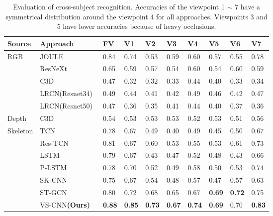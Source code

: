 \documentclass[journal]{IEEEtran}
\begin{document}
\begin{table*}[!t] \footnotesize
\begin{center}
\caption{Evaluation of cross-subject recognition. Accuracies of the viewpoint 1 $\sim$ 7 have a symmetrical distribution around the viewpoint 4 for all approaches. Viewpoints 3 and 5 have lower accuracies because of heavy occlusions.}
\label{tab:crossSub}
\begin{tabular}{|p{1 cm}|p{2.3cm}|p{1cm}|p{1cm}|p{1cm}|p{1cm}|p{1cm}|p{1cm}|p{1cm}|p{1cm}|}
\hline
Source & Approach & FV & V1 & V2 & V3  & V4 & V5 & V6 & V7  \\
\hline
\multirow{4}{*}{RGB} & JOULE~\cite{JOULE2016} & 0.84  & 0.74 & 0.53 & 0.59 & 0.60 & 0.57 & 0.55 & 0.78  \\
 & ResNeXt~\cite{ResNeXtARX2018} & 0.65  & 0.59 & 0.57 & 0.54 & 0.60 & 0.54 & 0.60 & 0.59 \\
 & C3D~\cite{C3DICCV2015} & 0.47  & 0.32  & 0.32  & 0.33  & 0.44  & 0.40  & 0.33  & 0.34   \\
 & LRCN(Resnet34)~\cite{LRCNCVPR2015} & 0.49  & 0.44  & 0.41  & 0.42  & 0.49  & 0.46  & 0.42  & 0.47  \\
 & LRCN(Resnet50)~\cite{LRCNCVPR2015} & 0.47  & 0.36  & 0.35  & 0.41  & 0.44  & 0.40  & 0.37  & 0.36  \\
 \hline
\multirow{1}{*}{Depth} & C3D~\cite{C3DICCV2015} & 0.54  &  0.53 & 0.53  & 0.53  & 0.52  & 0.53 & 0.51  & 0.56 \\
\hline
\multirow{7}{*}{Skeleton} & TCN~\cite{TCN2017} & 0.78 & 0.67 & 0.49 & 0.40 & 0.49 & 0.45 & 0.50 & 0.67 \\
 & Res-TCN~\cite{ResTCN2017} & 0.81 & 0.67 & 0.60 & 0.53 & 0.55 & 0.53 & 0.61 & 0.73  \\
 & LSTM~\cite{ShahroudyNTU2016} & 0.79 & 0.67 & 0.43 & 0.47 & 0.52 & 0.48 & 0.43 & 0.66  \\
 & P-LSTM~\cite{ShahroudyNTU2016} & 0.78 & 0.70 & 0.52 & 0.49 & 0.58 & 0.50 & 0.53 & 0.74 \\
 & SK-CNN~\cite{EnhancedSK2017} & 0.75 & 0.67 & 0.54 & 0.48 & 0.57 & 0.47 & 0.57 & 0.63 \\
 & ST-GCN~\cite{STGCN2018} & 0.80 & 0.72 & 0.68 & 0.65 & 0.67 & \textbf{0.69} & \textbf{0.72} & 0.75 \\
 & VS-CNN\textbf{(Ours)} & \textbf{0.88}  & \textbf{0.85} &  \textbf{0.73} & \textbf{0.67} & \textbf{0.74} & \textbf{0.69} & 0.70 & \textbf{0.83} \\
\hline
\end{tabular}
\end{center}
\end{table*}
\end{document}
